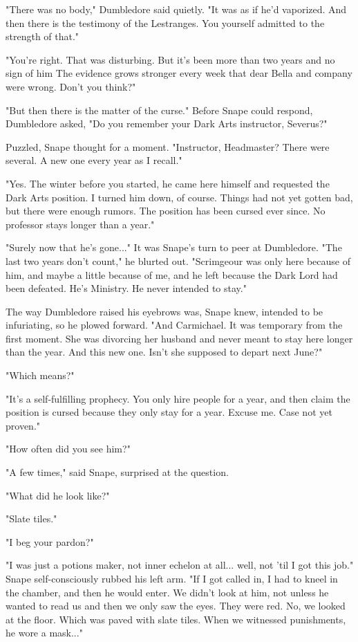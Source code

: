 "There was no body," Dumbledore said quietly. "It was as if he'd vaporized. And then there is the testimony of the Lestranges. You yourself admitted to the strength of that."

"You're right. That was disturbing. But it's been more than two years and no sign of him The evidence grows stronger every week that dear Bella and company were wrong. Don't you think?"

"But then there is the matter of the curse." Before Snape could respond, Dumbledore asked, "Do you remember your Dark Arts instructor, Severus?"

Puzzled, Snape thought for a moment. "Instructor, Headmaster? There were several. A new one every year as I recall."

"Yes. The winter before you started, he came here himself and requested the Dark Arts position. I turned him down, of course. Things had not yet gotten bad, but there were enough rumors. The position has been cursed ever since. No professor stays longer than a year."

"Surely now that he's gone..." It was Snape's turn to peer at Dumbledore. "The last two years don't count," he blurted out. "Scrimgeour was only here because of him, and maybe a little because of me, and he left because the Dark Lord had been defeated. He's Ministry. He never intended to stay."

The way Dumbledore raised his eyebrows was, Snape knew, intended to be infuriating, so he plowed forward. "And Carmichael. It was temporary from the first moment. She was divorcing her husband and never meant to stay here longer than the year. And this new one. Isn't she supposed to depart next June?"

"Which means?"

"It's a self-fulfilling prophecy. You only hire people for a year, and then claim the position is cursed because they only stay for a year. Excuse me. Case not yet proven."

"How often did you see him?"

"A few times," said Snape, surprised at the question.

"What did he look like?"

"Slate tiles."

"I beg your pardon?"

"I was just a potions maker, not inner echelon at all... well, not 'til I got this job." Snape self-consciously rubbed his left arm. "If I got called in, I had to kneel in the chamber, and then he would enter. We didn't look at him, not unless he wanted to read us and then we only saw the eyes. They were red. No, we looked at the floor. Which was paved with slate tiles. When we witnessed punishments, he wore a mask..."

